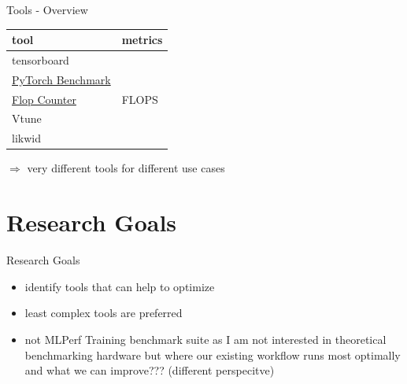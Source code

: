 \documentclass[compress,aspectratio=169]{beamer}
\begin{document}
\begin{frame}{Tools - Overview}

\begin{table}[]
\begin{tabular}{@{}ll@{}}
\toprule
tool               & metrics \\ \midrule
tensorboard        &         \\
\href{https://pytorch.org/tutorials/recipes/recipes/benchmark.html}{PyTorch Benchmark}
 &         \\
\href{https://github.com/facebookresearch/fvcore/blob/main/docs/flop_count.md}{Flop Counter} & FLOPS \\
Vtune              &         \\
likwid             &         \\
\bottomrule
\end{tabular}
\end{table}


$\Rightarrow$ very different tools for different use cases

\end{frame}

\section{Research Goals}

\begin{frame}{Research Goals}

\begin{itemize}
    \item identify tools that can help to optimize 
    \item least complex tools are preferred
    \item not MLPerf Training benchmark suite as I am not interested in theoretical benchmarking hardware but where our existing workflow runs most optimally and what we can improve??? (different perspecitve)
\end{itemize}

\end{frame}
\end{document}
